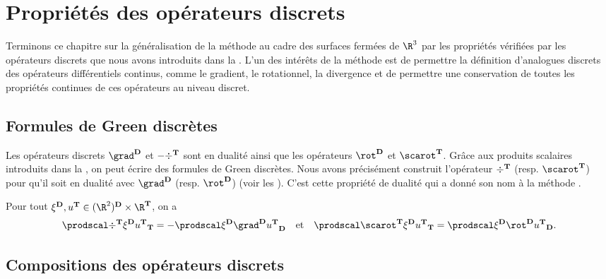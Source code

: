 \section{Propriétés des opérateurs discrets} \label{sec:properties_of_the_operators}

Terminons ce chapitre sur la généralisation de la méthode \ddfv au cadre des surfaces fermées de $\R^3$ par les propriétés vérifiées par les opérateurs discrets que nous avons introduits dans la . L'un des intérêts de la méthode \ddfv est de permettre la définition d'analogues discrets des opérateurs différentiels continus, comme le gradient, le rotationnel, la divergence et de permettre une conservation de toutes les propriétés continues de ces opérateurs au niveau discret.

\subsection{Formules de Green discrètes}

Les opérateurs discrets $\grad^\ensdiamantplat$ et $-\div^{\mathbf{T}}$ sont en dualité ainsi que les opérateurs $\rot^\ensdiamantplat$ et $\scarot^\ensddfvplat$. Grâce aux produits scalaires introduits dans la , on peut écrire des formules de Green discrètes. Nous avons précisément construit l'opérateur $\div^{\mathbf{T}}$ (resp. $\scarot^\ensddfvplat$) pour qu'il soit en dualité avec $\grad^\ensdiamantplat$ (resp. $\rot^\ensdiamantplat$) (voir les ). C'est cette propriété de dualité qui a donné son nom à la méthode \ddfv.

\begin{theo} \label{theo:discrete_green_formulae}
Pour tout $\xi^\ensdiamantplat, u^\ensddfvplat \in (\R^2)^\ensdiamantplat \times \R^\ensddfvplat$, on a
\[
\prodscalddfv{\div^\ensddfvplat \xi^\ensdiamantplat}{u^\ensddfvplat} = - \prodscalD{\xi^\ensdiamantplat}{\grad^\ensdiamantplat u^\ensddfvplat}
\quad
\text{et}
\quad
\prodscalddfv{\scarot^\ensddfvplat \xi^\ensdiamantplat}{u^\ensddfvplat} = \prodscalD{\xi^\ensdiamantplat}{\rot^\ensdiamantplat u^\ensddfvplat}.
\]
\end{theo}

\subsection{Compositions des opérateurs discrets} \label{sec:compositions_discrete_operators}

